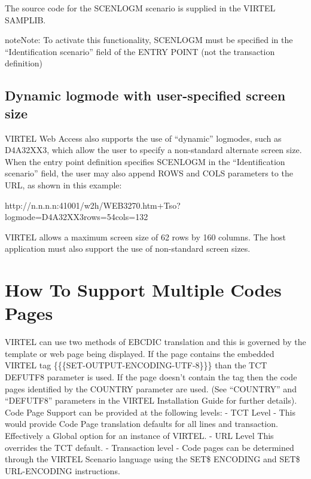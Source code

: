 \documentclass[letterpaper,10pt,english]{sphinxmanual}
\begin{document}
The source code for the SCENLOGM scenario is supplied in the VIRTEL SAMPLIB.

\begin{sphinxadmonition}{note}{Note:}
To activate this functionality, SCENLOGM must be specified in the “Identification scenario” field of the ENTRY POINT (not the transaction definition)
\end{sphinxadmonition}


\subsection{Dynamic logmode with user-specified screen size}
\label{\detokenize{User_Guide:dynamic-logmode-with-user-specified-screen-size}}
VIRTEL Web Access also supports the use of “dynamic” logmodes, such as D4A32XX3, which allow the user to specify a
non-standard alternate screen size. When the entry point definition specifies SCENLOGM in the “Identification
scenario” field, the user may also append ROWS and COLS parameters to the URL, as shown in this example:

\begin{sphinxVerbatim}[commandchars=\\\{\}]
http://n.n.n.n:41001/w2h/WEB3270.htm+Tso?logmode=D4A32XX3\PYGZam{}rows=54\PYGZam{}cols=132
\end{sphinxVerbatim}

VIRTEL allows a maximum screen size of 62 rows by 160 columns. The host application must also support the use of
non-standard screen sizes.


\section{How To Support Multiple Codes Pages}
\label{\detokenize{User_Guide:how-to-support-multiple-codes-pages}}
VIRTEL can use two methods of EBCDIC translation and this is governed by the template or web page being displayed. If
the page contains the embedded VIRTEL tag \{\{\{SET-OUTPUT-ENCODING-UTF-8\}\}\} than the TCT DEFUTF8 parameter is
used. If the page doesn’t contain the tag then the code pages identified by the COUNTRY parameter are used. (See
“COUNTRY” and “DEFUTF8” parameters in the VIRTEL Installation Guide for further details).
Code Page Support can be provided at the following levels:
- TCT Level - This would provide Code Page translation defaults for all lines and transaction. Effectively a Global option for an instance of VIRTEL.
- URL Level \textendash{} This overrides the TCT default.
- Transaction level - Code pages can be determined through the VIRTEL Scenario language using the SET\$ ENCODING
and SET\$ URL-ENCODING instructions.
\end{document}
